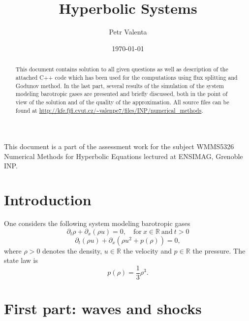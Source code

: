 \documentclass[a4paper, 10pt]{article}
\title{\horrule{0.5 pt}\\[0.4cm] \textbf{Hyperbolic Systems} \horrule{1 pt}}
\author{Petr Valenta}
\date{\today}
\begin{document}
\maketitle
{\small This document is a part of the assessment work for the subject WMMS5326 Numerical Methods for Hyperbolic Equations lectured at ENSIMAG, Grenoble INP.}

\begin{abstract}
This document contains solution to all given questions as well as description of the attached C++ code which has been used for the computations using flux splitting and Godunov method. In the last part, several results of the simulation of the system modeling barotropic gases are presented and briefly discussed, both in the point of view of the solution and of the quality of the approximation. All source files can be found at \url{http://kfe.fjfi.cvut.cz/~valenpe7/files/INP/numerical_methods}.
\end{abstract}

\tableofcontents

\section{Introduction}
One considers the following system modeling barotropic gases
\begin{equation}
\label{1}
\partial_{t} \rho + \partial_x \left( \rho u \right) = 0, \quad \mathrm{for} \ x \in \mathbb{R} \ \mathrm{and} \ t > 0
\end{equation}
\begin{equation}
\label{2}
\partial_t \left( \rho u \right) + \partial_x \left( \rho u^{2} + p\left( \rho \right)  \right) = 0,
\end{equation}
where $ \rho > 0 $ denotes the density, $ u \in \mathbb{R} $ the velocity and $ p \in \mathbb{R} $ the pressure. The state law is
\begin{equation}
\label{3}
p\left( \rho \right) = \frac{1}{3} \rho^{3}.
\end{equation}

\section{First part: waves and shocks}
\end{document}
